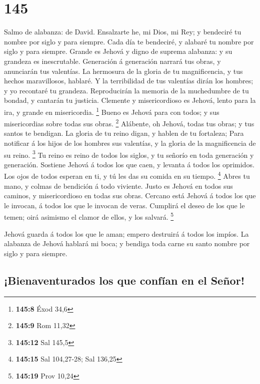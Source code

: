 \hypertarget{section-144}{%
\section{145}\label{section-144}}

 Salmo de alabanza: de David. Ensalzarte he, mi Dios, mi
Rey; y bendeciré tu nombre por siglo y para siempre.  Cada
día te bendeciré, y alabaré tu nombre por siglo y para siempre.
 Grande es Jehová y digno de suprema alabanza: y su grandeza
es inescrutable.  Generación á generación narrará tus obras,
y anunciarán tus valentías.  La hermosura de la gloria de tu
magnificencia, y tus hechos maravillosos, hablaré.  Y la
terribilidad de tus valentías dirán los hombres; y yo recontaré tu
grandeza.  Reproducirán la memoria de la muchedumbre de tu
bondad, y cantarán tu justicia.  Clemente y misericordioso
es Jehová, lento para la ira, y grande en misericordia. \footnote{\textbf{145:8}
  Éxod 34,6}  Bueno es Jehová para con todos; y sus
misericordias sobre todas sus obras. \footnote{\textbf{145:9} Rom 11,32}
 Alábente, oh Jehová, todas tus obras; y tus santos te
bendigan.  La gloria de tu reino digan, y hablen de tu
fortaleza;  Para notificar á los hijos de los hombres sus
valentías, y la gloria de la magnificencia de su reino. \footnote{\textbf{145:12}
  Sal 145,5}  Tu reino es reino de todos los siglos, y tu
señorío en toda generación y generación.  Sostiene Jehová á
todos los que caen, y levanta á todos los oprimidos.  Los
ojos de todos esperan en ti, y tú les das su comida en su tiempo.
\footnote{\textbf{145:15} Sal 104,27-28; Sal 136,25}  Abres
tu mano, y colmas de bendición á todo viviente.  Justo es
Jehová en todos sus caminos, y misericordioso en todas sus obras.
 Cercano está Jehová á todos los que le invocan, á todos
los que le invocan de veras.  Cumplirá el deseo de los que
le temen; oirá asimismo el clamor de ellos, y los salvará. \footnote{\textbf{145:19}
  Prov 10,24}

 Jehová guarda á todos los que le aman; empero destruirá á
todos los impíos.  La alabanza de Jehová hablará mi boca; y
bendiga toda carne su santo nombre por siglo y para siempre.

\hypertarget{bienaventurados-los-que-confuxedan-en-el-seuxf1or}{%
\subsection{¡Bienaventurados los que confían en el
Señor!}\label{bienaventurados-los-que-confuxedan-en-el-seuxf1or}}

